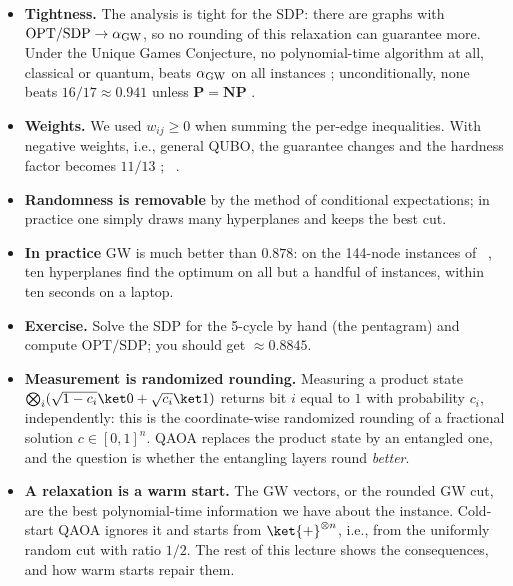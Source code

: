 \documentclass[handoutsbeamer.tex]{subfiles}
\begin{document}
\begin{frame}
\begin{itemize}\setlength\itemsep{0.3em}
    \item \textbf{Tightness.} The analysis is tight for the SDP: there are graphs with $\mathrm{OPT}/\mathrm{SDP} \to \alpha_{\rm GW}$, so no rounding of this relaxation can guarantee more. Under the Unique Games Conjecture, no polynomial-time algorithm at all, classical or quantum, beats $\alpha_{\rm GW}$ on all instances \citep{khot2010unique}; unconditionally, none beats $16/17 \approx 0.941$ unless $\mathbf P = \mathbf{NP}$ \citep{Hstad2001}.
    \item \textbf{Weights.} We used $w_{ij}\ge 0$ when summing the per-edge inequalities. With negative weights, i.e., general QUBO, the guarantee changes and the hardness factor becomes $11/13$ \citep{charikar2004maximizing}; \Chap~.
    \item \textbf{Randomness is removable} by the method of conditional expectations; in practice one simply draws many hyperplanes and keeps the best cut.
    \item \textbf{In practice} GW is much better than $0.878$: on the 144-node instances of \Chap~, ten hyperplanes find the optimum on all but a handful of instances, within ten seconds on a laptop.
    \item \textbf{Exercise.} Solve the SDP for the 5-cycle by hand (the pentagram) and compute $\mathrm{OPT}/\mathrm{SDP}$; you should get $\approx 0.8845$.
\end{itemize}
\end{frame}

\begin{frame}
\begin{itemize}\setlength\itemsep{0.4em}
    \item \textbf{Measurement is randomized rounding.} Measuring a product state $\bigotimes_i(\sqrt{1-c_i}\ket0 + \sqrt{c_i}\ket1)$ returns bit $i$ equal to $1$ with probability $c_i$, independently: this is the coordinate-wise randomized rounding of a fractional solution $c \in [0,1]^n$. QAOA replaces the product state by an entangled one, and the question is whether the entangling layers round \emph{better}.
    \item \textbf{A relaxation is a warm start.} The GW vectors, or the rounded GW cut, are the best polynomial-time information we have about the instance. Cold-start QAOA ignores it and starts from $\ket{+}^{\otimes n}$, i.e., from the uniformly random cut with ratio $1/2$. The rest of this lecture shows the consequences, and how warm starts repair them.
\end{itemize}
\end{frame}
\end{document}
